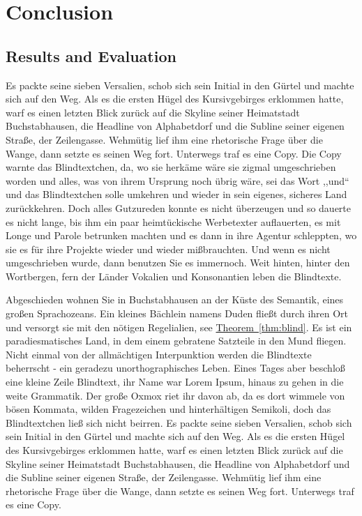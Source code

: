 \documentclass[12pt,a4paper,twoside]{scrartcl}
\numberwithin{equation}{section}
\newcommand{\refthm}[1]{\hyperref[#1]{Theorem~\ref*{#1}}}
\begin{document}

\section{Conclusion}

\subsection{Results and Evaluation}

Es packte seine sieben Versalien, schob sich sein Initial in den Gürtel und machte sich auf den Weg. Als es die ersten Hügel des Kursivgebirges erklommen hatte, warf es einen letzten Blick zurück auf die Skyline seiner Heimatstadt Buchstabhausen, die Headline von Alphabetdorf und die Subline seiner eigenen Straße, der Zeilengasse. Wehmütig lief ihm eine rhetorische Frage über die Wange, dann setzte es seinen Weg fort. Unterwegs traf es eine Copy. Die Copy warnte das Blindtextchen, da, wo sie herkäme wäre sie zigmal umgeschrieben worden und alles, was von ihrem Ursprung noch übrig wäre, sei das Wort ,,und`` und das Blindtextchen solle umkehren und wieder in sein eigenes, sicheres Land zurückkehren. Doch alles Gutzureden konnte es nicht überzeugen und so dauerte es nicht lange, bis ihm ein paar heimtückische Werbetexter auflauerten, es mit Longe und Parole betrunken machten und es dann in ihre Agentur schleppten, wo sie es für ihre Projekte wieder und wieder mißbrauchten. Und wenn es nicht umgeschrieben wurde, dann benutzen Sie es immernoch. Weit hinten, hinter den Wortbergen, fern der Länder Vokalien und Konsonantien leben die Blindtexte.

Abgeschieden wohnen Sie in Buchstabhausen an der Küste des Semantik, eines großen Sprachozeans. Ein kleines Bächlein namens Duden fließt durch ihren Ort und versorgt sie mit den nötigen Regelialien, see \refthm{thm:blind}. Es ist ein paradiesmatisches Land, in dem einem gebratene Satzteile in den Mund fliegen. Nicht einmal von der allmächtigen Interpunktion werden die Blindtexte beherrscht - ein geradezu unorthographisches Leben. Eines Tages aber beschloß eine kleine Zeile Blindtext, ihr Name war Lorem Ipsum, hinaus zu gehen in die weite Grammatik. Der große Oxmox riet ihr davon ab, da es dort wimmele von bösen Kommata, wilden Fragezeichen und hinterhältigen Semikoli, doch das Blindtextchen ließ sich nicht beirren. Es packte seine sieben Versalien, schob sich sein Initial in den Gürtel und machte sich auf den Weg. Als es die ersten Hügel des Kursivgebirges erklommen hatte, warf es einen letzten Blick zurück auf die Skyline seiner Heimatstadt Buchstabhausen, die Headline von Alphabetdorf und die Subline seiner eigenen Straße, der Zeilengasse. Wehmütig lief ihm eine rhetorische Frage über die Wange, dann setzte es seinen Weg fort. Unterwegs traf es eine Copy.
\end{document}
